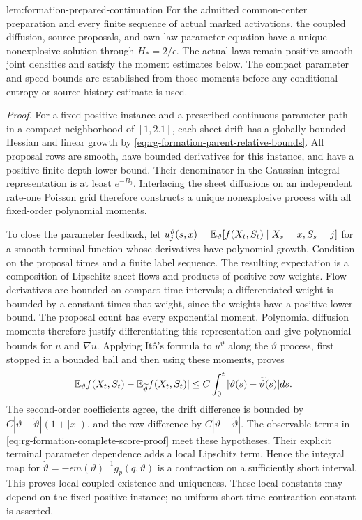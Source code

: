 {lem:formation-prepared-continuation}
For the admitted common-center preparation and every finite sequence
of actual marked activations, the coupled diffusion, source proposals,
and own-law parameter equation have a unique nonexplosive solution
through $H_*=2/\epsilon$. The actual laws remain positive smooth
joint densities and satisfy the moment estimates below. The compact
parameter and speed bounds are established from those moments before
any conditional-entropy or source-history estimate is used.

\emph{Proof.}
For a fixed positive instance and a prescribed continuous parameter
path in a compact neighborhood of $[1,2.1]$, each sheet drift has a
globally bounded Hessian and linear growth by
\cref{eq:rg-formation-parent-relative-bounds}. All proposal rows are
smooth, have bounded derivatives for this instance, and have a
positive finite-depth lower bound. Their denominator in the Gaussian
integral representation is at least $e^{-B_0}$. Interlacing the sheet
diffusions on an independent rate-one Poisson grid therefore constructs
a unique nonexplosive process with all fixed-order polynomial moments.

To close the parameter feedback, let
$u_j^{\vartheta}(s,x)=\mathbb E_{\vartheta}[f(X_t,S_t)\mid X_s=x,S_s=j]$
for a smooth terminal function whose derivatives have polynomial
growth. Condition on the proposal times and a finite label sequence.
The resulting expectation is a composition of Lipschitz sheet flows
and products of positive row weights. Flow derivatives are bounded on
compact time intervals; a differentiated weight is bounded by a
constant times that weight, since the weights have a positive lower
bound. The proposal count has every exponential moment. Polynomial
diffusion moments therefore justify differentiating this
representation and give polynomial bounds for $u$ and $\nabla u$.
Applying It\^o's formula to $u^{\widetilde\vartheta}$ along the
$\vartheta$ process, first stopped in a bounded ball and then using
these moments, proves
\begin{equation}
 |\mathbb E_{\vartheta}f(X_t,S_t)
       -\mathbb E_{\widetilde\vartheta}f(X_t,S_t)|
 \le C\int_0^t|\vartheta(s)-\widetilde\vartheta(s)|ds.
 \label{eq:rg-formation-local-law-dependence}
\end{equation}
The second-order coefficients agree, the drift difference is bounded
by $C|\vartheta-\widetilde\vartheta|(1+|x|)$, and the row difference
by $C|\vartheta-\widetilde\vartheta|$. The observable terms in
\cref{eq:rg-formation-complete-score-proof} meet these hypotheses.
Their explicit terminal parameter dependence adds a local Lipschitz
term. Hence the integral map for
$\dot\vartheta=-\epsilon m(\vartheta)^{-1}g_p(q,\vartheta)$ is a
contraction on a sufficiently short interval. This proves local
coupled existence and uniqueness. These local constants may depend on
the fixed positive instance; no uniform short-time contraction
constant is asserted.

